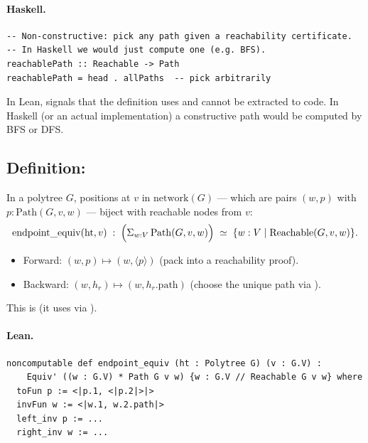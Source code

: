 \documentclass[11pt,a4paper]{article}
\begin{document}
\paragraph{Haskell.}
\begin{lstlisting}[style=haskell]
-- Non-constructive: pick any path given a reachability certificate.
-- In Haskell we would just compute one (e.g. BFS).
reachablePath :: Reachable -> Path
reachablePath = head . allPaths  -- pick arbitrarily
\end{lstlisting}

\begin{fidelitynote}
In Lean,  signals that the definition uses
 and cannot be extracted to code.  In Haskell (or an
actual implementation) a constructive path would be computed by BFS or DFS.
\end{fidelitynote}


\subsection{Definition: }

\begin{defn}
In a polytree $G$, positions at $v$ in $\mathrm{network}(G)$ --- which are
pairs $(w, p)$ with $p : \mathrm{Path}(G, v, w)$ --- biject with reachable
nodes from $v$:
\[
  \mathrm{endpoint\_equiv}(\mathrm{ht}, v) \;:\;
  \Bigl(\Sigma_{w : V}\, \mathrm{Path}(G, v, w)\Bigr)
  \;\simeq\;
  \{w : V \mid \mathrm{Reachable}(G, v, w)\}.
\]
\begin{itemize}
  \item Forward: $(w, p) \mapsto (w, \langle p \rangle)$ (pack into a
        reachability proof).
  \item Backward: $(w, h_r) \mapsto (w, h_r.\mathrm{path})$ (choose the
        unique path via ).
\end{itemize}
This is  (it uses  via
).
\end{defn}

\paragraph{Lean.}
\begin{lstlisting}[style=lean]
noncomputable def endpoint_equiv (ht : Polytree G) (v : G.V) :
    Equiv' ((w : G.V) * Path G v w) {w : G.V // Reachable G v w} where
  toFun p := <|p.1, <|p.2|>|>
  invFun w := <|w.1, w.2.path|>
  left_inv p := ...
  right_inv w := ...
\end{lstlisting}
\end{document}
